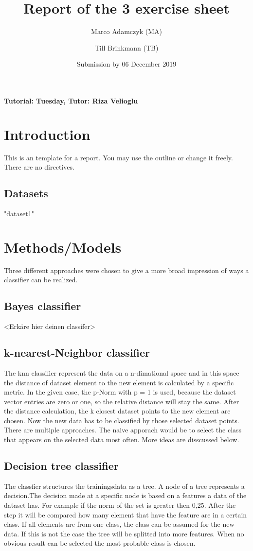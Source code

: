 \documentclass[a4paper,12pt]{article}
\title{Report of the 3\ts{rd} exercise sheet}
\author{Marco Adamczyk (MA) \and Till Brinkmann (TB)}
\date{Submission by 06\ts{th} December 2019}
\newcommand{\initials}[1]{\marginpar{\quad\texttt{#1}}}
\begin{document}

\pagestyle{myheadings}
    
\maketitle

\begin{center}
    \textbf{Tutorial: Tuesday, Tutor: Riza Velioglu}
\end{center}

\section{Introduction}
This is an template for a report. You may use the outline or change it freely. There are no directives.
\subsection{Datasets}
"dataset1"


\section{Methods/Models}
Three different approaches were chosen to give a more broad impression of ways a classifier can be realized.
\subsection{Bayes classifier}
<Erkäre hier deinen classifer>
\initials{TM}
\subsection{k-nearest-Neighbor classifier}
The knn classifier represent the data on a n-dimational space and in this space the distance of dataset element to the new element is calculated by a specific metric. In the given case, the p-Norm with p = 1 is used, because the dataset vector entries are zero or one, so the relative distance will stay the same.
After the distance calculation, the k closest dataset points to the new element are chosen. Now the new data has to be classified by those selected dataset points. There are multiple approaches. The naive apporach would be to select the class that appears on the selected data most often. More ideas are disscussed below.
\initials{MA}
\subsection{Decision tree classifier}
The classfier structures the trainingsdata as a tree. A node of a tree represents a decision.The decision made at a specific node is based on a features a data of the dataset has. For example if the norm of the set is greater then 0,25. After the step it will be compared how many element that have the feature are in a certain class. If all elements are from one class, the class can be assumed for the new data. If this is not the case the tree will be splitted into more features. When no obvious result can be selected the most probable class is chosen.
\initials{MA}
\end{document}
